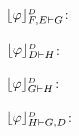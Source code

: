 \begin{example}
\begin{multicols}{3}
{$\projectionDefinitional{\varphi}{F, E \seq G}$:
\begin{prooftree}
		 
	 
\end{prooftree}
}
\end{multicols}


\begin{multicols}{3}{
$\projectionDefinitional{\varphi}{D \seq H}$:
\begin{prooftree}
 
 
 
\end{prooftree}

$\projectionDefinitional{\varphi}{G \seq H}$:
\begin{prooftree}
 
 
 
\end{prooftree}

$\projectionDefinitional{\varphi}{H \seq G, D}$:
\begin{prooftree}
		 
	 
\end{prooftree}
}
\end{multicols}
\hfill\QED
\end{example}

